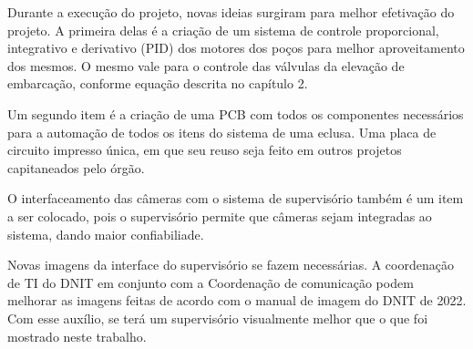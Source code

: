 Durante a execução do projeto, novas ideias surgiram para melhor efetivação do projeto. A primeira delas é a criação de um sistema de controle proporcional, integrativo e derivativo (PID) dos motores dos poços para melhor aproveitamento dos mesmos. O mesmo vale para o controle das válvulas da elevação de embarcação, conforme equação descrita no capítulo 2. 

Um segundo item é a criação de uma PCB com todos os componentes necessários para a automação de todos os itens do sistema de uma eclusa. Uma placa de circuito impresso única, em que seu reuso seja feito em outros projetos capitaneados pelo órgão.

O interfaceamento das câmeras com o sistema de supervisório também é um item a ser colocado, pois o supervisório permite que câmeras sejam integradas ao sistema, dando maior confiabiliade.

Novas imagens da interface do supervisório se fazem necessárias. A coordenação de TI do DNIT em conjunto com a Coordenação de comunicação podem melhorar as imagens feitas de acordo com o manual de imagem do DNIT de 2022. Com esse auxílio, se terá um supervisório visualmente melhor que o que foi mostrado neste trabalho.